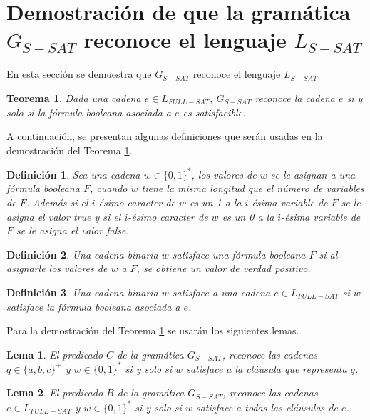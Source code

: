 \documentclass[12pt]{article}
\newtheorem{theorem}{Teorema}
\newtheorem{lemma}{Lema}
\newtheorem{definition}{Definición}
\newcommand{\true}{\textit{true}}
\newcommand{\false}{\textit{false}}
\begin{document}
\section{Demostración de que la gramática $G_{S-SAT}$ reconoce el lenguaje $L_{S-SAT}$}

En esta sección se demuestra que $G_{S-SAT}$ reconoce el lenguaje $L_{S-SAT}$.
\begin{theorem}
    \label{teo:gsat}
    Dada una cadena $e\in L_{FULL-SAT}$, $G_{S-SAT}$ reconoce la cadena $e$ si y solo si la fórmula booleana asociada a $e$ es satisfacible. 
\end{theorem}

A continuación, se presentan algunas definiciones que serán usadas en la demostración del Teorema \ref{teo:gsat}.

\begin{definition}
    Sea una cadena $w\in \{0,1\}^*$, los valores de $w$ se le asignan a una fórmula booleana $F$, cuando $w$ tiene la misma longitud
    que el número de variables de $F$. Además si el $i$-ésimo caracter de $w$ es un 1 a la $i$-ésima variable de $F$ se le asigna
    el valor \true{} y si el $i$-ésimo caracter de $w$ es un 0 a la $i$-ésima variable de $F$ se le asigna
    el valor \false{}.
\end{definition}

\begin{definition}
    Una cadena binaria $w$ satisface una fórmula booleana $F$ si al asignarle los valores de $w$ a $F$, se obtiene un valor de verdad positivo.
\end{definition}

\begin{definition}
    Una cadena binaria $w$ satisface a una cadena $e\in L_{FULL-SAT}$ si $w$ satisface la fórmula booleana asociada a $e$. 
\end{definition}

Para la demostración del Teorema \ref{teo:gsat} se usarán los siguientes lemas.

\begin{lemma}
    \label{lem:predc}
    El predicado $C$ de la gramática $G_{S-SAT}$, reconoce las cadenas $q\in \{a,b,c\}^+$ y $w\in \{0,1\}^*$ si y solo si $w$ satisface a la cláusula que representa $q$.  
\end{lemma}

\begin{lemma}
    \label{lem:predb}
    El predicado $B$ de la gramática $G_{S-SAT}$, reconoce las cadenas $e\in L_{FULL-SAT}$ y $w\in \{0,1\}^*$ si y solo si $w$ satisface a todas las cláusulas de $e$. 
\end{lemma}
\end{document}
